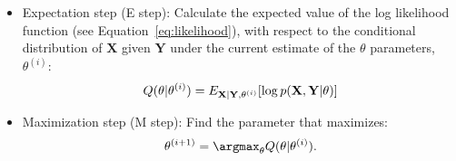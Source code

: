 \begin{itemize}
	\item Expectation step (E step): Calculate the expected value of the log likelihood function (see Equation~\ref{eq:likelihood}), with respect to the conditional distribution of $\bm{X}$ given $\bm{Y}$ under the current estimate of the $\theta$ parameters, $\theta^{(i)}$: %
	\begin{align}
	Q(\theta|\theta^{(i)}) = E_{ {\bf X}| {\bf Y}, \theta^{(i)}} [ \log p ({\bf X}, {\bf Y} | \theta) ]
	\label{eq:qfunction}
	\end{align}
	\item Maximization step (M step): Find the parameter that maximizes: %
	\begin{align}
	\theta^{(i+1)} = \argmax_{\theta} Q(\theta | \theta^{(i)} ) .
	\label{eq:argmaxem}
	\end{align}
\end{itemize}

